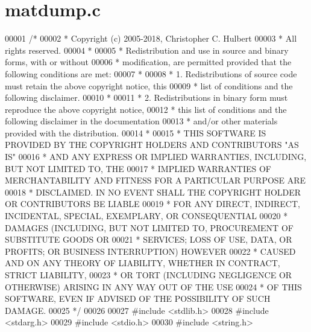 \hypertarget{matdump_8c_source}{}\section{matdump.\+c}
\label{matdump_8c_source}

\begin{DoxyCode}
00001 \textcolor{comment}{/*}
00002 \textcolor{comment}{ * Copyright (c) 2005-2018, Christopher C. Hulbert}
00003 \textcolor{comment}{ * All rights reserved.}
00004 \textcolor{comment}{ *}
00005 \textcolor{comment}{ * Redistribution and use in source and binary forms, with or without}
00006 \textcolor{comment}{ * modification, are permitted provided that the following conditions are met:}
00007 \textcolor{comment}{ *}
00008 \textcolor{comment}{ * 1. Redistributions of source code must retain the above copyright notice, this}
00009 \textcolor{comment}{ *    list of conditions and the following disclaimer.}
00010 \textcolor{comment}{ *}
00011 \textcolor{comment}{ * 2. Redistributions in binary form must reproduce the above copyright notice,}
00012 \textcolor{comment}{ *    this list of conditions and the following disclaimer in the documentation}
00013 \textcolor{comment}{ *    and/or other materials provided with the distribution.}
00014 \textcolor{comment}{ *}
00015 \textcolor{comment}{ * THIS SOFTWARE IS PROVIDED BY THE COPYRIGHT HOLDERS AND CONTRIBUTORS "AS IS"}
00016 \textcolor{comment}{ * AND ANY EXPRESS OR IMPLIED WARRANTIES, INCLUDING, BUT NOT LIMITED TO, THE}
00017 \textcolor{comment}{ * IMPLIED WARRANTIES OF MERCHANTABILITY AND FITNESS FOR A PARTICULAR PURPOSE ARE}
00018 \textcolor{comment}{ * DISCLAIMED. IN NO EVENT SHALL THE COPYRIGHT HOLDER OR CONTRIBUTORS BE LIABLE}
00019 \textcolor{comment}{ * FOR ANY DIRECT, INDIRECT, INCIDENTAL, SPECIAL, EXEMPLARY, OR CONSEQUENTIAL}
00020 \textcolor{comment}{ * DAMAGES (INCLUDING, BUT NOT LIMITED TO, PROCUREMENT OF SUBSTITUTE GOODS OR}
00021 \textcolor{comment}{ * SERVICES; LOSS OF USE, DATA, OR PROFITS; OR BUSINESS INTERRUPTION) HOWEVER}
00022 \textcolor{comment}{ * CAUSED AND ON ANY THEORY OF LIABILITY, WHETHER IN CONTRACT, STRICT LIABILITY,}
00023 \textcolor{comment}{ * OR TORT (INCLUDING NEGLIGENCE OR OTHERWISE) ARISING IN ANY WAY OUT OF THE USE}
00024 \textcolor{comment}{ * OF THIS SOFTWARE, EVEN IF ADVISED OF THE POSSIBILITY OF SUCH DAMAGE.}
00025 \textcolor{comment}{ */}
00026 
00027 \textcolor{preprocessor}{#include <stdlib.h>}
00028 \textcolor{preprocessor}{#include <stdarg.h>}
00029 \textcolor{preprocessor}{#include <stdio.h>}
00030 \textcolor{preprocessor}{#include <string.h>}

\end{DoxyCode}
